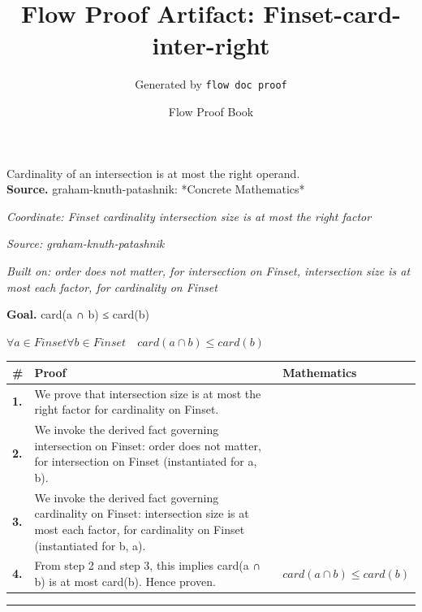 \documentclass[11pt]{article}
\title{Flow Proof Artifact: Finset-card-inter-right}
\author{Generated by \texttt{flow doc proof}}
\date{Flow Proof Book}
\theoremstyle{definition}
\begin{document}
\maketitle
Cardinality of an intersection is at most the right operand.\\[0.5em]
\textbf{Source.} graham-knuth-patashnik: *Concrete Mathematics*\\[0.5em]
\bigskip
{}\par
\smallskip\noindent\textit{Coordinate: Finset \cdot cardinality \cdot intersection size is at most the right factor}\par
\smallskip\noindent\textit{Source: graham-knuth-patashnik}\par
\smallskip\noindent\textit{Built on: order does not matter, for intersection on Finset, intersection size is at most each factor, for cardinality on Finset}\par
\medskip
\noindent\textbf{Goal.} card(a ∩ b) ≤ card(b)\par
\noindent$\displaystyle \forall a \in Finset \forall b \in Finset\quad card(a ∩ b) \le card(b)$\par
\medskip
\noindent
\begin{tabular}{@{} >{\raggedright\arraybackslash}p{} >{\raggedright\arraybackslash}p{} >{\raggedleft\arraybackslash}p{} @{}}
\textbf{\#} & \textbf{Proof} & \textbf{Mathematics} \\
\midrule
\textbf{1.} & We prove that intersection size is at most the right factor for cardinality on Finset. & \\[0.45em]
\textbf{2.} & We invoke the derived fact governing intersection on Finset: order does not matter, for intersection on Finset (instantiated for a, b). & \\[0.45em]
\textbf{3.} & We invoke the derived fact governing cardinality on Finset: intersection size is at most each factor, for cardinality on Finset (instantiated for b, a). & \\[0.45em]
\textbf{4.} & From step 2 and step 3, this implies card(a ∩ b) is at most card(b). Hence proven. & $\displaystyle card(a ∩ b) \le card(b)$ \\[0.45em]
\bottomrule
\end{tabular}
\label{thm:Finset-cardinality-intersection_size_is_at_most_the_right_factor}
\par\medskip\hrule
\end{document}
